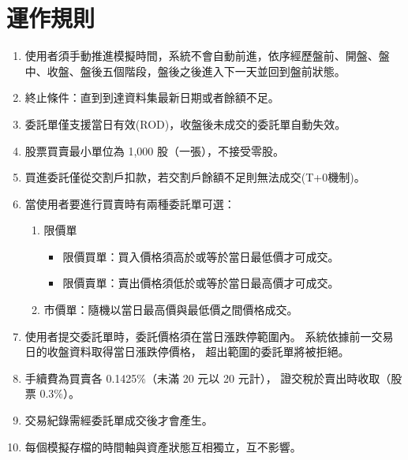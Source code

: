 \documentclass[UTF8, a4paper, 12pt, fontset=none]{ctexart}
\begin{document}
    \section{運作規則}
    \begin{enumerate}
        \item 使用者須手動推進模擬時間，系統不會自動前進，依序經歷盤前、開盤、盤中、收盤、盤後五個階段，盤後之後進入下一天並回到盤前狀態。
        \item 終止條件：直到到達資料集最新日期或者餘額不足。
        \item 委託單僅支援當日有效(ROD)，收盤後未成交的委託單自動失效。

        \item 股票買賣最小單位為 1,000 股（一張），不接受零股。

        \item 買進委託僅從交割戶扣款，若交割戶餘額不足則無法成交(T+0機制)。 

        \item 當使用者要進行買賣時有兩種委託單可選：
            \begin{enumerate}
                \item 限價單
                \begin{itemize}
                    \item 限價買單：買入價格須高於或等於當日最低價才可成交。
                    \item 限價賣單：賣出價格須低於或等於當日最高價才可成交。
                \end{itemize}
                \item 市價單：隨機以當日最高價與最低價之間價格成交。
            \end{enumerate}
        \item 使用者提交委託單時，委託價格須在當日漲跌停範圍內。
        系統依據前一交易日的收盤資料取得當日漲跌停價格，
        超出範圍的委託單將被拒絕。
        
        \item 手續費為買賣各 0.1425\%（未滿 20 元以 20 元計），
        證交稅於賣出時收取（股票 0.3\%）。
        
        \item 交易紀錄需經委託單成交後才會產生。

        \item 每個模擬存檔的時間軸與資產狀態互相獨立，互不影響。
    \end{enumerate}
\end{document}
